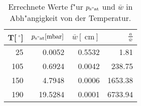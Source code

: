 
\begin{table}[!h]
\begin{center}
\begin{tabular}{|r|r|r|r|}
\hline
T[$\SI{}{^\circ}$] & $p_\mathrm{s"at}[\SI{}{\milli\bar}]$ & $\bar{w}[\SI{}{\centi\meter}]$ & $\frac{a}{\bar{w}}$\\
\hline
\hline
25  & 0.0052  & 0.5532 & 1.81\\
105 & 0.6924  & 0.0042 & 238.75\\
150 & 4.7948  & 0.0006 & 1653.38\\
190 & 19.5284 & 0.0001 & 6733.94\\
\hline
\end{tabular}
\caption[]{Errechnete Werte f"ur $p_\mathrm{s"at}$ und $\bar{w}$ in Abh"angigkeit von der Temperatur.}
\label{tab:weg}
\end{center}
\end{table}
